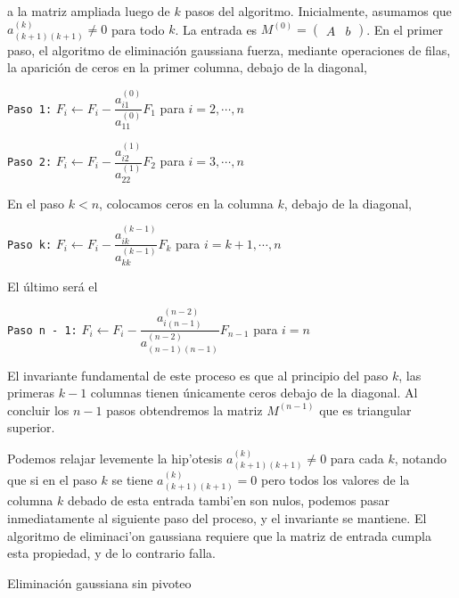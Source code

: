 a la matriz ampliada luego de $k$ pasos del algoritmo. Inicialmente, asumamos que $a_{(k+1)(k+1)}^{(k)} \neq 0$ para todo $k$. La entrada es $M^{(0)} = \left(\begin{array}{c|c}A & b\end{array}\right)$. En el primer paso, el algoritmo de eliminación gaussiana fuerza, mediante operaciones de filas, la aparición de ceros en la primer columna, debajo de la diagonal,

\texttt{Paso 1:} $F_i \leftarrow F_i - \dfrac{a_{i1}^{(0)}}{a_{11}^{(0)}}F_1$ para $i = 2, \cdots, n$

\texttt{Paso 2:} $F_i \leftarrow F_i - \dfrac{a_{i2}^{(1)}}{a_{22}^{(1)}}F_2$ para $i = 3, \cdots, n$

En el paso $k < n$, colocamos ceros en la columna $k$, debajo de la diagonal,

\texttt{Paso k:} $F_i \leftarrow F_i - \dfrac{a_{ik}^{(k - 1)}}{a_{kk}^{(k - 1)}}F_k$ para $i = k + 1, \cdots, n$

El último será el

\texttt{Paso n - 1:} $F_i \leftarrow F_i - \dfrac{a_{i(n-1)}^{(n-2)}}{a_{(n-1)(n-1)}^{(n-2)}}F_{n - 1}$ para $i = n$

El invariante fundamental de este proceso es que al principio del paso $k$, las primeras $k - 1$ columnas tienen únicamente ceros debajo de la diagonal. Al concluir los $n - 1$ pasos obtendremos la matriz $M^{(n - 1)}$ que es triangular superior.

Podemos relajar levemente la hip'otesis $a_{(k+1)(k+1)}^{(k)} \neq 0$ para cada $k$, notando que si en el paso $k$ se tiene $a_{(k+1)(k+1)}^{(k)} = 0$ pero todos los valores de la columna $k$ debado de esta entrada tambi'en son nulos, podemos pasar inmediatamente al siguiente paso del proceso, y el invariante se mantiene. El algoritmo de eliminaci'on gaussiana requiere que la matriz de entrada cumpla esta propiedad, y de lo contrario falla.

\begin{algorithm}
\DontPrintSemicolon
{}

\caption[]{Eliminación gaussiana sin pivoteo}
\end{algorithm}

